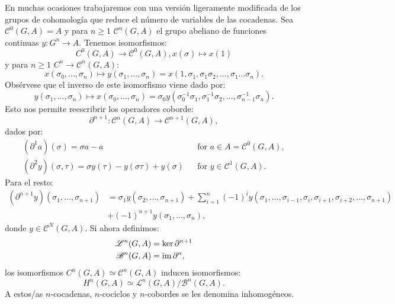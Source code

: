 \documentclass[a4paper,12pt, leqno]{report}
\begin{document}
En muchas ocasiones trabajaremos con una versión ligeramente modificada de los grupos de cohomología que reduce el número de variables de las cocadenas. Sea $\mathscr{C}^0(G,A)=A$ y para $n\geq 1$ $\mathscr{C}^n(G,A)$ el grupo abeliano de funciones continuas $y:G^n\rightarrow A$. Tenemos isomorfismos:
\begin{equation*}
C^0(G,A)\rightarrow \mathscr{C}^0(G,A),x(\sigma)\mapsto x(1)
\end{equation*}
y para $n\geq 1$ $C^n \rightarrow \mathscr{C}^n(G,A)$:
\begin{equation*}
x(\sigma_0,...,\sigma_n)\mapsto y(\sigma_1,...,\sigma_n)=x(1,\sigma_1,\sigma_1 \sigma_2,...,\sigma_1...\sigma_n).
\end{equation*}
Obsérvese que el inverso de este isomorfismo viene dado por:
\begin{equation*}
y(\sigma_1,...,\sigma_n)\mapsto x(\sigma_0,...,\sigma_n)=\sigma_0 y(\sigma_0^{-1}\sigma_1,\sigma_1^{-1}\sigma_2,...,\sigma_{n-1}^{-1}\sigma_n).
\end{equation*}
Esto nos permite reescribrir los operadores coborde:
\begin{equation*}
\partial^{n+1}:\mathscr{C}^n(G,A)\rightarrow \mathscr{C}^{n+1}(G,A),
\end{equation*}
dados por:
\begin{align*}
(\partial^1 a)(\sigma)= \sigma a -a & &\text{for } a\in A=\mathscr{C}^0(G,A),\\
(\partial^2 y)(\sigma,\tau)=\sigma y(\tau)-y(\sigma \tau)+y(\sigma) & & \text{for } y\in \mathscr{C}^1(G,A).
\end{align*}
Para el resto:
\begin{align*}
(\partial^{n+1}y)(\sigma_1,...,\sigma_{n+1})&=\sigma_1y(\sigma_2,...,\sigma_{n+1})
+\sum_{i=1}^{n}(-1)^i y(\sigma_1,...,\sigma_{i-1},\sigma_i,\sigma_{i+1},\sigma_{i+2},...,\sigma_{n+1})\\
&+(-1)^{n+1}y(\sigma_1,...,\sigma_n),
\end{align*}
donde $y\in \mathscr{C}^N(G,A)$. Si ahora definimos:
\begin{align*}
\mathscr{L}^n(G,A)&=\ker \partial^{n+1}\\
\mathscr{B}^n(G,A)&=\mathrm{im}\, \partial^n,
\end{align*}
los isomorfismos $C^n(G,A)\simeq \mathscr{C}^n(G,A)$ inducen isomorfismos:
\begin{equation*}
H^n(G,A)\simeq \mathscr{L}^n(G,A)/\mathscr{B}^n(G,A).
\end{equation*}
A estos/as $n$-cocadenas, $n$-cociclos y $n$-cobordes se les denomina inhomogéneos.
\end{document}
